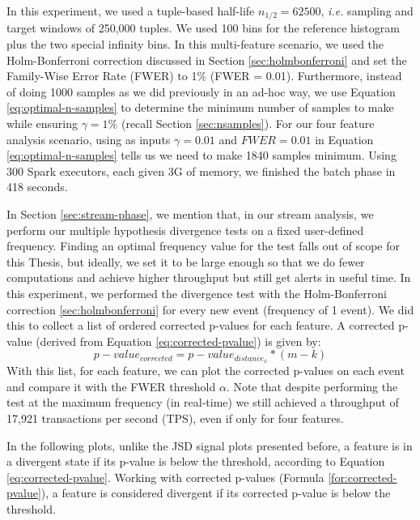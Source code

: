 In this experiment, we used a tuple-based half-life $n_{1/2}=62500$, \textit{i.e.} sampling and target windows of 250,000 tuples. We used 100 bins for the reference histogram plus the two special infinity bins. In this multi-feature scenario, we used the Holm-Bonferroni correction discussed in Section \ref{sec:holmbonferroni} and set the Family-Wise Error Rate (FWER) to 1\% (FWER = 0.01). Furthermore, instead of doing 1000 samples as we did previously in an ad-hoc way, we use Equation \ref{eq:optimal-n-samples} to determine the minimum number of samples to make while ensuring $\gamma=1\%$ (recall Section \ref{sec:nsamples}). For our four feature analysis scenario, using as inputs  $\gamma=0.01$ and $FWER=0.01$ in Equation \ref{eq:optimal-n-samples} tells us we need to make 1840 samples minimum. Using 300 Spark executors, each given 3G of memory, we finished the batch phase in 418 seconds.

In Section \ref{sec:stream-phase}, we mention that, in our stream analysis, we perform our multiple hypothesis divergence tests on a fixed user-defined frequency. Finding an optimal frequency value for the test falls out of scope for this Thesis, but ideally, we set it to be large enough so that we do fewer computations and achieve higher throughput but still get alerts in useful time. In this experiment, we performed the divergence test with the Holm-Bonferroni correction \ref{sec:holmbonferroni} for every new event (frequency of 1 event). We did this to collect a list of ordered corrected p-values for each feature. A corrected p-value (derived from Equation \ref{eq:corrected-pvalue}) is given by:
\begin{equation}
    p-value_{corrected} = p-value_{distance_{x}} * (m - k)
    \label{for:corrected-pvalue}
\end{equation}
With this list, for each feature, we can plot the corrected p-values on each event and compare it with the FWER threshold $\alpha$. Note that despite performing the test at the maximum frequency (in real-time) we still achieved a throughput of 17,921 transactions per second (TPS), even if only for four features.

In the following plots, unlike the JSD signal plots presented before, a feature is in a divergent state if its p-value is below the threshold, according to Equation \ref{eq:corrected-pvalue}. Working with corrected p-values (Formula \ref{for:corrected-pvalue}), a feature is considered divergent if its corrected p-value is below the threshold.

